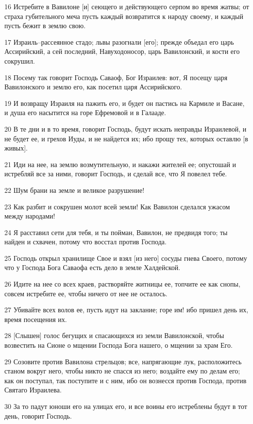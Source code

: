 \par 16 Истребите в Вавилоне [и] сеющего и действующего серпом во время жатвы; от страха губительного меча пусть каждый возвратится к народу своему, и каждый пусть бежит в землю свою.
\par 17 Израиль--рассеянное стадо; львы разогнали [его]; прежде объедал его царь Ассирийский, а сей последний, Навуходоносор, царь Вавилонский, и кости его сокрушил.
\par 18 Посему так говорит Господь Саваоф, Бог Израилев: вот, Я посещу царя Вавилонского и землю его, как посетил царя Ассирийского.
\par 19 И возвращу Израиля на пажить его, и будет он пастись на Кармиле и Васане, и душа его насытится на горе Ефремовой и в Галааде.
\par 20 В те дни и в то время, говорит Господь, будут искать неправды Израилевой, и не будет ее, и грехов Иуды, и не найдется их; ибо прощу тех, которых оставлю [в живых].
\par 21 Иди на нее, на землю возмутительную, и накажи жителей ее; опустошай и истребляй все за ними, говорит Господь, и сделай все, что Я повелел тебе.
\par 22 Шум брани на земле и великое разрушение!
\par 23 Как разбит и сокрушен молот всей земли! Как Вавилон сделался ужасом между народами!
\par 24 Я расставил сети для тебя, и ты пойман, Вавилон, не предвидя того; ты найден и схвачен, потому что восстал против Господа.
\par 25 Господь открыл хранилище Свое и взял [из него] сосуды гнева Своего, потому что у Господа Бога Саваофа есть дело в земле Халдейской.
\par 26 Идите на нее со всех краев, растворяйте житницы ее, топчите ее как снопы, совсем истребите ее, чтобы ничего от нее не осталось.
\par 27 Убивайте всех волов ее, пусть идут на заклание; горе им! ибо пришел день их, время посещения их.
\par 28 [Слышен] голос бегущих и спасающихся из земли Вавилонской, чтобы возвестить на Сионе о мщении Господа Бога нашего, о мщении за храм Его.
\par 29 Созовите против Вавилона стрельцов; все, напрягающие лук, расположитесь станом вокруг него, чтобы никто не спасся из него; воздайте ему по делам его; как он поступал, так поступите и с ним, ибо он вознесся против Господа, против Святаго Израилева.
\par 30 За то падут юноши его на улицах его, и все воины его истреблены будут в тот день, говорит Господь.
